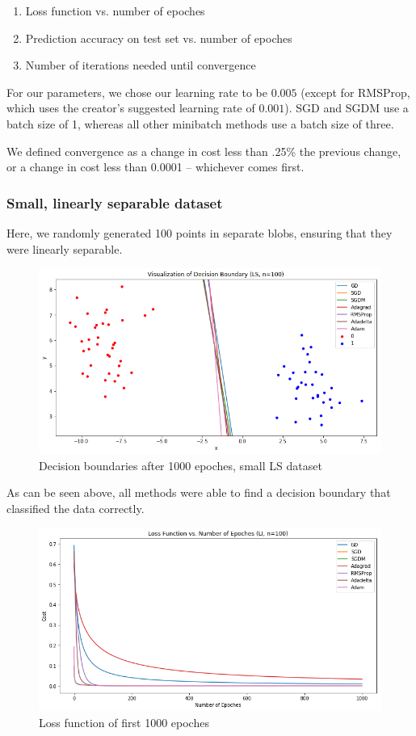 \documentclass[twoside,11pt]{homework}
\begin{document}
\begin{enumerate}
	\item Loss function vs. number of epoches
	\item Prediction accuracy on test set vs. number of epoches
	\item Number of iterations needed until convergence
\end{enumerate}

For our parameters, we chose our learning rate to be $0.005$ (except for RMSProp, which uses the creator's suggested learning rate of $0.001$). SGD and SGDM use a batch size of 1, whereas all other minibatch methods use a batch size of three.

We defined convergence as a change in cost less than .25\% the previous change, or a change in cost less than 0.0001 -- whichever comes first.

\subsubsection{Small, linearly separable dataset}
Here, we randomly generated 100 points in separate blobs, ensuring that they were linearly separable.
\begin{figure}[H]
		\centering
		\includegraphics[scale=.5]{q5/sep_100/lines.png}
		\caption{Decision boundaries after 1000 epoches, small LS dataset}
	\end{figure}

As can be seen above, all methods were able to find a decision boundary that classified the data correctly.

	\begin{figure}[H]
		\centering
		\includegraphics[scale=.5]{q5/sep_100/loss_n1000.png}
		\caption{Loss function of first 1000 epoches}
	\end{figure}
\end{document}
